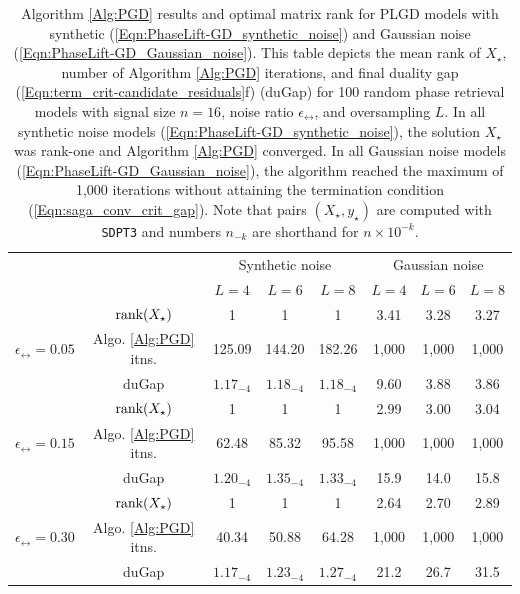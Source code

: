 \begin{table}[H]
\centering 
\begin{tabular}{ |cc|c|c|c|c|c|c| }
\hline
	\multicolumn{2}{|c|}{} &	\multicolumn{3}{c|}{Synthetic noise} 	&	\multicolumn{3}{c|}{Gaussian noise}  \\
\multicolumn{2}{|c|}{}  	&	\multicolumn{1}{c}{$L = 4$}	&	\multicolumn{1}{c}{$L = 6$}	&	\multicolumn{1}{c|}{$L = 8$} &	\multicolumn{1}{c}{$L = 4$}	&	\multicolumn{1}{c}{$L = 6$}	&	\multicolumn{1}{c|}{$L = 8$}		\\
\hline
& $\textnormal{rank}(X_\star)$
	&	1	&	1	&	1	&	3.41 	&	3.28 	&	3.27 \\
$\epsilon_\rel = 0.05$ &	 Algo. \ref{Alg:PGD} itns.
	&	125.09	&	144.20 & 182.26	&	1,000	&	1,000	&	1,000\\
& 	duGap
	&	$1.17_{-4}$  &  $1.18_{-4}$ &  $1.18_{-4}$ 	&	9.60   & 3.88   & 3.86\\
\hline
& $\textnormal{rank}(X_\star)$
	&	1	&	1	&	1	&	2.99 	&	3.00 &	3.04 \\
$\epsilon_\rel = 0.15$ &	 Algo. \ref{Alg:PGD} itns.
	&	62.48  & 85.32 &  95.58	&	1,000	&	1,000	&	1,000\\
& 	duGap
	&	$1.20_{-4}$ &  $1.35_{-4}$ &  $1.33_{-4}$ &	15.9 &  14.0 &  15.8 \\
\hline
& $\textnormal{rank}(X_\star)$
	&	1	&	1	&	1	&	2.64  	&	2.70  &	2.89\\
$\epsilon_\rel = 0.30$ &	 Algo. \ref{Alg:PGD} itns.
	&	40.34  & 50.88  & 64.28	&	1,000	&	1,000	&	1,000\\
& 	duGap
	&	$1.17_{-4}$ &  $1.23_{-4}$ &  $1.27_{-4}$		&	   21.2 &  26.7  & 31.5\\
 \hline
\end{tabular}

\caption{Algorithm \ref{Alg:PGD} results and optimal matrix rank for PLGD models with synthetic (\ref{Eqn:PhaseLift-GD_synthetic_noise}) and Gaussian noise (\ref{Eqn:PhaseLift-GD_Gaussian_noise}).  This table depicts the mean rank of $X_\star$, number of Algorithm \ref{Alg:PGD} iterations, and final duality gap (\ref{Eqn:term_crit-candidate_residuals}f) (duGap) for 100 random phase retrieval models with signal size $n=16$, noise ratio $\epsilon_\rel$, and oversampling $L$.  In all synthetic noise models (\ref{Eqn:PhaseLift-GD_synthetic_noise}), the solution $X_\star$ was rank-one and Algorithm \ref{Alg:PGD} converged.  In all Gaussian noise models (\ref{Eqn:PhaseLift-GD_Gaussian_noise}), the algorithm reached the maximum of 1,000 iterations without attaining the termination condition (\ref{Eqn:saga_conv_crit_gap}).  Note that pairs $(X_\star, y_\star)$ are computed with \texttt{SDPT3} and numbers $n_{-k}$ are shorthand for $n \times 10^{-k}$.} \label{Tab:average_rank_soln_matrix_with_gaussian_dual_variable}
\end{table}



